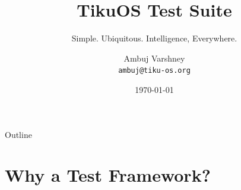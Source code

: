 \documentclass[aspectratio=169, 10pt]{beamer}
\title[TikuOS Testing]{TikuOS Test Suite}
\subtitle{Simple. Ubiquitous. Intelligence, Everywhere.}
\author[Ambuj Varshney]{Ambuj Varshney \\ \texttt{ambuj@tiku-os.org}}
\date{\today}
\begin{document}
\begin{frame}
\titlepage
\end{frame}

\begin{frame}{Outline}
\tableofcontents
\end{frame}

\section{Why a Test Framework?}
\end{document}
